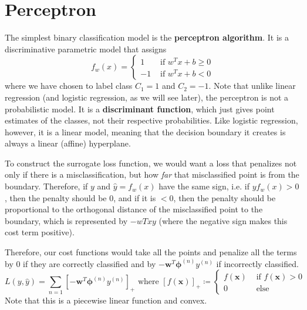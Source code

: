\section{Perceptron}

  \begin{definition}
    The simplest binary classification model is the \textbf{perceptron algorithm}. It is a discriminative parametric model that assigns 
    \begin{equation}
      f_w (x) = \begin{cases} 1 & \text{ if } w^T x + b \geq 0 \\ -1 & \text { if } w^T x + b < 0 \end{cases}
    \end{equation}
    where we have chosen to label class $C_1 = 1$ and $C_2 = -1$. Note that unlike linear regression (and logistic regression, as we will see later), the perceptron is not a probabilistic model. It is a \textbf{discriminant function}, which just gives point estimates of the classes, not their respective probabilities. Like logistic regression, however, it is a linear model, meaning that the decision boundary it creates is always a linear (affine) hyperplane. 
  \end{definition}

  To construct the surrogate loss function, we would want a loss that penalizes not only if there is a misclassification, but how \textit{far} that misclassified point is from the boundary. Therefore, if $y$ and $\hat{y} = f_w (x)$ have the same sign, i.e. if $y f_w (x) > 0$, then the penalty should be $0$, and if it is $< 0$, then the penalty should be proportional to the orthogonal distance of the misclassified point to the boundary, which is represented by $-wT x y$ (where the negative sign makes this cost term positive). 

  \begin{definition}
    Therefore, our cost functions would take all the points and penalize all the terms by $0$ if they are correctly classified and by $-\mathbf{w}^T \boldsymbol{\phi}^{(n)} y^{(n)}$ if incorrectly classified. 
    \begin{equation}
      L(y, \hat{y}) = \sum_{n=1} [ -\mathbf{w}^T \boldsymbol{\phi}^{(n)} y^{(n)} ]_+ \text{ where } [f(\mathbf{x})]_+ \coloneqq \begin{cases} f(\mathbf{x}) & \text{ if } f(\mathbf{x}) > 0 \\ 0 & \text{ else } \end{cases}
    \end{equation}
    Note that this is a piecewise linear function and convex. 
  \end{definition}


